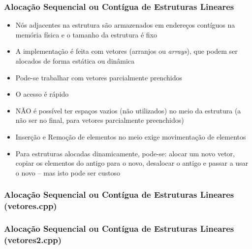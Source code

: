 \documentclass[aspectratio=169]{beamer}
\begin{document}
\begin{frame}\frametitle{Alocação Sequencial ou Contígua de Estruturas Lineares}
\begin{itemize}
	\item Nós adjacentes na estrutura são armazenados em endereços contíguos na memória física e o tamanho da estrutura é fixo
	\item A implementação é feita com vetores (arranjos ou \emph{arrays}), que podem ser alocados de forma estática ou dinâmica
	\item Pode-se trabalhar com vetores parcialmente prenchidos
	\item O acesso é rápido
	\item NÃO é possível ter espaços vazios (não utilizados) no meio da estrutura (a não ser no final, para vetores parcialmente preenchidos)
	\item Inserção e Remoção de elementos no meio exige movimentação de elementos
	\item Para estruturas alocadas dinamicamente, pode-se: alocar um novo vetor, copiar os elementos do antigo para o novo, desalocar o antigo e passar a usar o novo -- mas isto pode ser custoso
\end{itemize}
\end{frame}
	
\begin{frame}[fragile]\frametitle{Alocação Sequencial ou Contígua de Estruturas Lineares (vetores.cpp)}

\end{frame}

\begin{frame}[fragile]\frametitle{Alocação Sequencial ou Contígua de Estruturas Lineares (vetores2.cpp)}

\end{frame}
\end{document}
